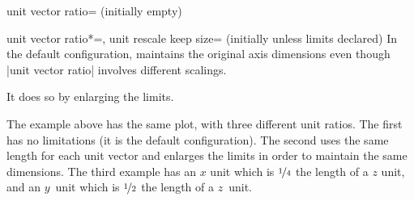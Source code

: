 \begin{pgfplotskey}{unit vector ratio= (initially empty)}
    \begin{pgfplotskeylist}{%
        unit vector ratio*=,
        unit rescale keep size= (initially unless limits declared)%
    }
    \label{key:unit:rescale:keep:size}
        In the default configuration, \PGFPlots{} maintains the original axis
        dimensions even though |unit vector ratio| involves different scalings.

        It does so by enlarging the limits.
\begin{codeexample}[]
\end{codeexample}
        \noindent The example above has the same plot, with three different
        unit ratios. The first has no limitations (it is the default
        configuration). The second uses the same length for each unit vector
        and enlarges the limits in order to maintain the same dimensions. The
        third example has an $x$ unit which is $\nicefrac14$ the length of a
        $z$ unit, and an $y$~unit which is $\nicefrac12$ the length of a
        $z$~unit.


\end{pgfplotskeylist}
\end{pgfplotskey}
